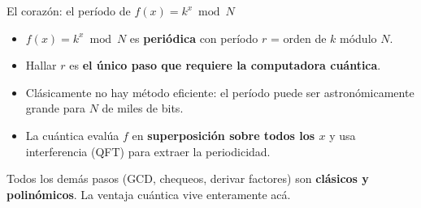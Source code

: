 \documentclass[aspectratio=169]{beamer}
\begin{document}
\begin{frame}{El corazón: el período de $f(x)=k^x \bmod N$}
  \begin{itemize}
    \setlength\itemsep{0.25em}
    \item $f(x) = k^x \bmod N$ es \textbf{periódica} con período $r$ = orden
          de $k$ módulo $N$.
    \item Hallar $r$ es \textbf{el único paso que requiere la computadora cuántica}.
    \item Clásicamente no hay método eficiente: el período puede ser
          astronómicamente grande para $N$ de miles de bits.
    \item La cuántica evalúa $f$ en \textbf{superposición sobre todos los $x$}
          y usa interferencia (QFT) para extraer la periodicidad.
  \end{itemize}

  \begin{alertblock}{}
    \small Todos los demás pasos (GCD, chequeos, derivar factores) son
    \textbf{clásicos y polinómicos}. La ventaja cuántica vive enteramente acá.
  \end{alertblock}

\end{frame}
\end{document}
